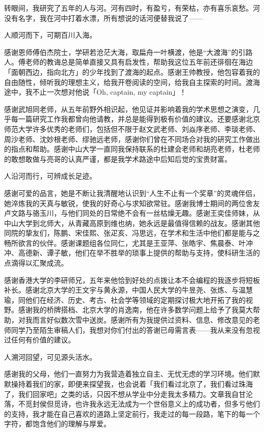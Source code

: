 

\begin{ack}

    转眼间，我研究了五年的人与河。河有四时，有盈亏，有荣枯，亦有喜乐哀愁。河没有名字，我在河中打着水漂，所有想说的话河便替我说了——

    人顺河而下，可期百川入海。
    
    感谢恩师傅伯杰院士，学研若沧茫大海，取扁舟一叶横渡，他是“大渡海”的引路人。傅老师的教诲总是简单直接又具有启发性，帮助我这位五年前还徘徊在海边「面朝西边，指向北方」的少年找到了渡海的起点。感谢王帅教授，他包容着我的自由随性，倾听我的理想主义，给我开卷阅读的空间，给我自主探索的时间。渡海途中，我不止一次想对他说「Oh, captain, my captain」！
    
    感谢武旭同老师，从五年前野外相识起，他见证并影响着我的学术思想之演变，几乎每一篇研究工作我都曾向他请教，并总是能得到极有价值的建议。还要感谢北京师范大学许多优秀的老师们，包括但不限于赵文武老师、刘焱序老师、李琰老师、周沙老师、沈妙根老师、缪驰远老师，感谢你们曾在不同场合对我的研究工作做出的指点和帮助。感谢中山大学一直同我保持联系的杜建会老师和胡亮老师，杜老师的敢想敢做与亮哥的认真严谨，都是我学术路途中后知后觉的宝贵财富。
    
    人沿河而行，可辨成长足迹。
    
    感谢可爱的品言，她是不断让我清醒地认识到“人生不止有一个奖章”的灵魂伴侣，她淬炼我的天真与敏锐，使我的好奇心与求知欲常驻。感谢我博士期间的两位舍友卢文路与骆玉川，与他们同处的日常绝不会有一丝枯燥无趣。感谢王奕佳师妹，从中山大学到北师大，从青藏高原到维也纳，她永远是最值得信赖的战友。感谢其他同院的挚友们，陈鹏、宋佳熙、张疋亥、冯思远，在学术和生活中他们都是能与之畅所欲言的伙伴。感谢课题组各位同仁，尤其是王亚萍、张皓宇、焦晨泰、叶冲冲、高德新、谭子敏，他们在举不胜举的琐事上提供的帮助与支持，使科研生活的点滴得以汇聚成流。
    
    感谢香港大学的李研师兄，五年来他恰到好处的点拨让本不会编程的我逐步将短板补长。感谢北京大学的王文宇与黄永源，中国人民大学的牛昱尧、张炼、与温慧瑜，同他们在经济、历史、考古、社会学等领域的定期探讨极大地开拓了我的视野。感谢我的桥牌搭档、北京大学的肖逸南，他在许多数学问题上给予了我莫大帮助，对我而言好似数次雪中送炭。感谢所有为我提供过资料、信息、修改意见的老师同学乃至陌生审稿人们，我想对你们付出的答谢已毋需言表——我从来没有忽视过任何有价值的建议。
    
    人溯河回望，可见源头活水。
    
    感谢我的父母，他们一直努力为我营造着独立自主、无忧无虑的学习环境。他们默默操持着我们的家，即便来探望我，也会说着「我们看过北京了，我们看过珠海了，我们回家吧」之类的话，只因不想从学业中分走我太多精力。文章我自甘沦落，不觅封侯但觅诗，也许我永远无法成为一个世俗意义上的成功者，但多亏他们的支持，我才能在自己喜欢的道路上坚定前行，我走过的每一段路，笔下的每一个字符，都饱含他们的理解与厚爱。
    

\end{ack}
